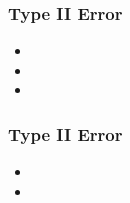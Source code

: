 
\begin{frame}
\frametitle{Type II Error}
\begin{itemize}
\item
\item
\item
\end{itemize}
\end{frame}


\begin{frame}
\frametitle{Type II Error}
\begin{itemize}
\item
\item
\end{itemize}
\end{frame}
